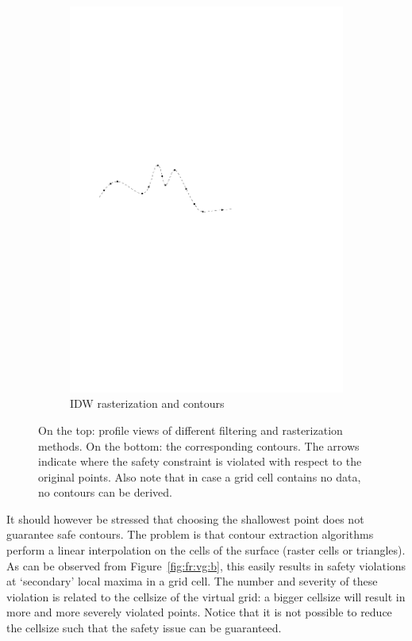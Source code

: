 \begin{figure}
\begin{subfigure}[b]{0.3\linewidth}
    \includegraphics[width=\textwidth,page=5]{figs/1Didw.pdf}
    \caption{IDW rasterization and contours}\label{fig:fr:idw:b}
  \end{subfigure}
\caption{On the top: profile views of different filtering and rasterization methods. On the bottom: the corresponding contours. The arrows indicate where the safety constraint is violated with respect to the original points. Also note that in case a grid cell contains no data, no contours can be derived.}
\label{fig:filterraster}
\end{figure}
It should however be stressed that choosing the shallowest point does not guarantee safe contours. 
The problem is that contour extraction algorithms perform a linear interpolation on the cells of the surface (raster cells or triangles). 
As can be observed from Figure~\ref{fig:fr:vg:b}, this easily results in safety violations at `secondary' local maxima in a grid cell. 
The number and severity of these violation is related to the cellsize of the virtual grid: a bigger cellsize will result in more and more severely violated points.
Notice that it is not possible to reduce the cellsize such that the safety issue can be guaranteed.  

